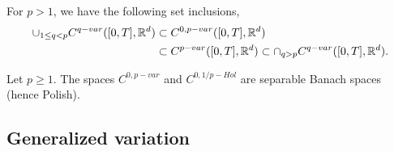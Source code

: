 \begin{corollary}
    For $p > 1$, we have the following set inclusions,
    \begin{align}
        \cup_{1 \le q < p} C^{q-var}([0,T], \mathbb{R}^d) &\subset C^{0,p-var}([0,T], \mathbb{R}^d) \\
        &\subset C^{p-var}([0,T], \mathbb{R}^d) \subset \cap_{q > p} C^{q-var}([0,T], \mathbb{R}^d).
    \end{align}
\end{corollary}

\begin{proposition}
    Let $p \ge 1$. The spaces $C^{0,p-var}$ and $C^{0,1/p-Hol}$ are separable Banach spaces (hence Polish).
\end{proposition}

\subsection{Generalized variation}